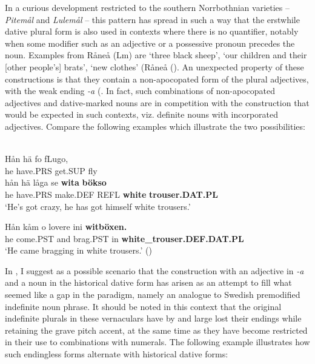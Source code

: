 In a curious development restricted to the southern Norrbothnian varieties –  \textit{Pitemål} and \textit{Lulemål} – this pattern has spread in such a way that the erstwhile dative plural form is also used in contexts where there is no quantifier, notably when some modifier such as an adjective or a possessive pronoun precedes the noun. Examples from Råneå (Lm) are  ‘three black sheep’,  ‘our children and their [other people’s] brats’,  ‘new clothes’ (Råneå (\citet{Wikberg2004}). An unexpected property of these constructions is that they contain a non-apocopated form of the plural adjectives, with the weak ending\textit{ {}-a }(\citet[36]{Dahlstedt1956}. In fact, such combinations of non-apocopated adjectives and dative-marked nouns are in competition with the construction that would be expected in such contexts, viz. definite nouns with incorporated adjectives. Compare the following examples which illustrate the two possibilities:

\ea\label{}
\\
\gll Hån  hä  fo  fLugo,\\
he  have.PRS  get.SUP  fly\\
\gll hån  hä  låga  se  \textbf{wita} \textbf{bökso}\\
he  have.PRS  make.DEF  REFL  \textbf{white} \textbf{trouser.DAT.PL}\\
\glt ‘He’s got crazy, he has got himself white trousers.’

\z

\ea
\gll Hån  kåm  o  lovere  ini  \textbf{witböxen.}\\
he  come.PST  and  brag.PST  in  \textbf{white\_trouser.DEF.DAT.PL}\\
\glt ‘He came bragging in white trousers.’ (\citet[105]{Nyström1993})

\z

In \citet{Dahl2008}, I suggest as a possible scenario that the construction with an adjective in\textit{ {}-a} and a noun in the historical dative form has arisen as an attempt to fill what seemed like a gap in the paradigm, namely an analogue to Swedish premodified indefinite noun phrase. It should be noted in this context that the original indefinite plurals in these vernaculars have by and large lost their endings while retaining the grave pitch accent, at the same time as they have become restricted in their use to combinations with numerals. The following example illustrates how such endingless forms alternate with historical dative forms: 

